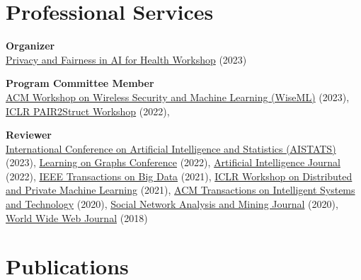 \documentclass[11pt]{article}
\begin{document}
\section{Professional Services}

\begin{outerlist}
	\item \textbf{Organizer}\\
	\href{https://priv-fair-ai-uk.github.io}{Privacy and Fairness in AI for Health Workshop} (2023)

	\item \textbf{Program Committee Member}\\
	\href{https://wisec2023.surrey.ac.uk/wiseml2023/}{ACM Workshop on Wireless Security and Machine Learning (WiseML)} (2023),
	\href{https://pair2struct-workshop.github.io/}{ICLR PAIR2Struct Workshop} (2022),

	\item \textbf{Reviewer}\\
	\href{http://aistats.org/aistats2023/}{International Conference on Artificial Intelligence and Statistics (AISTATS)} (2023),
	\href{https://logconference.org/}{Learning on Graphs Conference} (2022),
	\href{https://www.journals.elsevier.com/artificial-intelligence}{Artificial Intelligence Journal} (2022),
	\href{https://ieeexplore.ieee.org/xpl/RecentIssue.jsp?punumber=6687317}{IEEE Transactions on Big Data} (2021),
	\href{https://dp-ml.github.io/2021-workshop-ICLR/}{ICLR Workshop on Distributed and Private Machine Learning} (2021),
	\href{https://dl.acm.org/journal/tist}{ACM Transactions on Intelligent Systems and Technology} (2020),
	\href{https://www.springer.com/journal/13278}{Social Network Analysis and Mining Journal} (2020),
	\href{https://www.springer.com/journal/11280}{World Wide Web Journal} (2018)

\end{outerlist}

\section{Publications}
\end{document}
